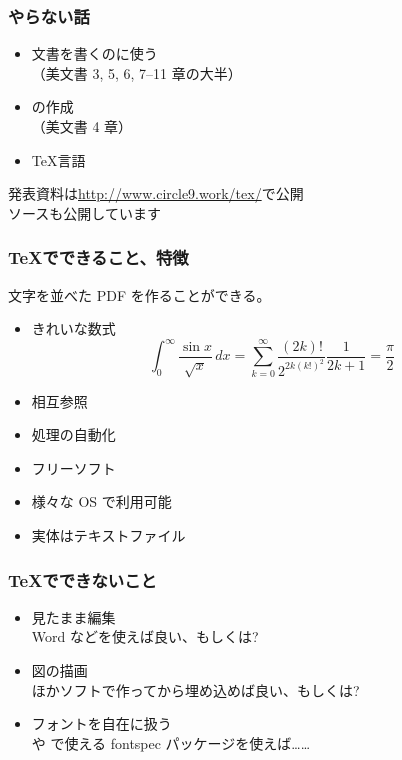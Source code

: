\begin{frame}
	\frametitle{やらない話}
	\begin{itemize}
		\item 文書を書くのに使う\\（美文書 3, 5, 6, 7--11 章の大半）
		\item {}の作成\\（美文書 4 章）
		\item {}\TeX 言語 
	\end{itemize}

	発表資料は\url{http://www.circle9.work/tex/}で公開\\
	ソースも公開しています
\end{frame}


\begin{frame}
	\frametitle{\protect\TeX でできること、特徴}
	文字を並べた PDF を作ることができる。
	\pause
	\begin{itemize}
		\item きれいな数式
			\[\int_0^\infty \frac{\sin x}{\sqrt{x}}\,dx
			=\sum_{k=0}^\infty \frac{(2k)!}{2^{2k (k!)^2}}\frac{1}{2k+1}=\frac{\pi}{2}\]
		\item 相互参照
		\item 処理の自動化
		\item フリーソフト
		\item 様々な OS で利用可能
		\item 実体はテキストファイル
	\end{itemize}
\end{frame}

\begin{frame}
	\frametitle{\TeX でできないこと}
	\begin{itemize}
		\item 見たまま編集\\
			{\footnotesize Word などを使えば良い、もしくは\LyX?}
		\item 図の描画\\
			{\footnotesize ほかソフトで作ってから埋め込めば良い、もしくは\TikZ?}
		\item フォントを自在に扱う\\
			{\footnotesize \LuaTeX や \XeTeX で使える fontspec パッケージを使えば……}
	\end{itemize}
\end{frame}

